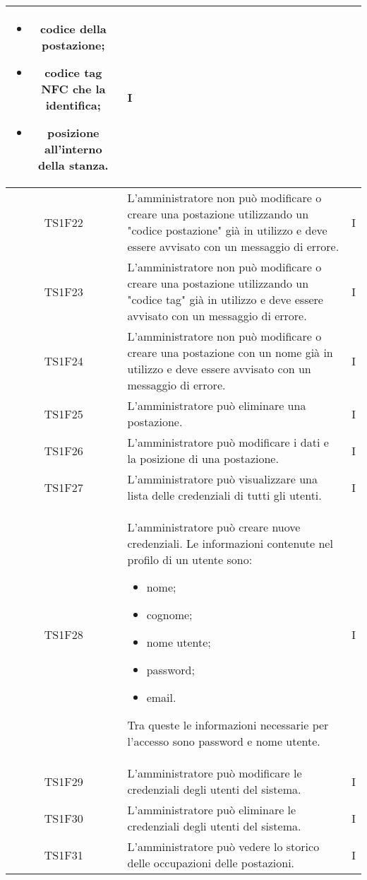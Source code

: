 \begin{center}
\begin{longtable}{|c|p{10cm}|c|}
			\begin{itemize}
				\item codice della postazione;
				\item codice tag NFC che la identifica;
				\item posizione all'interno della stanza.
			\end{itemize}
			& I \\					
			\hline				
			TS1F22 & L'amministratore non può modificare o creare una postazione utilizzando un "codice postazione" già in utilizzo e deve essere avvisato con un messaggio di errore. & I \\			
			\hline			
			TS1F23 & L'amministratore non può modificare o creare una postazione utilizzando un "codice tag" già in utilizzo e deve essere avvisato con un messaggio di errore. & I \\			
			\hline			
			TS1F24 & L'amministratore non può modificare o creare una postazione con un nome già in utilizzo e deve essere avvisato con un messaggio di errore. & I \\			
			\hline
			TS1F25 & L'amministratore può eliminare una postazione. & I \\	
			\hline	
			TS1F26 & L'amministratore può modificare i dati e la posizione di una postazione. & I \\			
			\hline	
			TS1F27 & L'amministratore può visualizzare una lista delle credenziali di tutti gli utenti. & I \\	
			\hline
			TS1F28 & L'amministratore può creare nuove credenziali. Le informazioni contenute nel profilo di un utente sono:
			\begin{itemize}
				\item nome;
				\item cognome;
				\item nome utente;
				\item password;
				\item email.
			\end{itemize}
			Tra queste le informazioni necessarie per l’accesso sono password e nome utente. & I \\	
			\hline
			TS1F29 & L’amministratore può modificare le credenziali degli utenti del sistema. & I \\	
			\hline
			TS1F30 & L’amministratore può eliminare le credenziali degli utenti del sistema. & I \\	
			\hline
			TS1F31 & L'amministratore può vedere lo storico delle occupazioni delle postazioni. & I \\	

\end{longtable}
\end{center}
